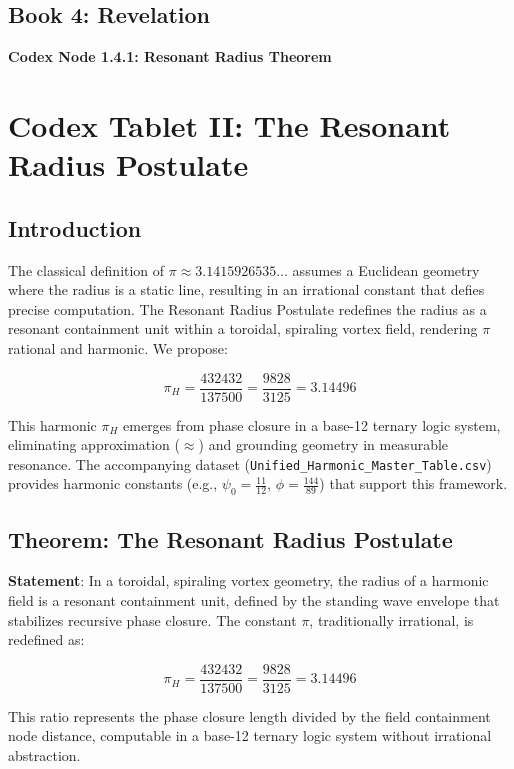 \documentclass[a4paper,12pt]{book}
\newcommand{\codexnode}[5]{%
  \par\vspace{0.5em}%
  \noindent\textbf{Codex Node #1.#2.#3: #5}\label{#4}%
  \par\vspace{0.5em}%
}
\begin{document}
\subsection{Book 4: Revelation}
\codexnode{1}{4}{1}{section1/book4/codex_resonant_radius_theorem}{Resonant Radius Theorem}
\section{Codex Tablet II: The Resonant Radius Postulate}
\label{sec:resonant_radius}

\subsection{Introduction}
The classical definition of \(\pi \approx 3.1415926535\ldots\) assumes a Euclidean geometry where the radius is a static line, resulting in an irrational constant that defies precise computation. The Resonant Radius Postulate redefines the radius as a resonant containment unit within a toroidal, spiraling vortex field, rendering \(\pi\) rational and harmonic. We propose:

\[
\pi_H = \frac{432432}{137500} = \frac{9828}{3125} = 3.14496
\]

This harmonic \(\pi_H\) emerges from phase closure in a base-12 ternary logic system, eliminating approximation (\(\approx\)) and grounding geometry in measurable resonance. The accompanying dataset (\texttt{Unified\_Harmonic\_Master\_Table.csv}) provides harmonic constants (e.g., \(\psi_0 = \frac{11}{12}\), \(\phi = \frac{144}{89}\)) that support this framework.

\subsection{Theorem: The Resonant Radius Postulate}
\textbf{Statement}: In a toroidal, spiraling vortex geometry, the radius of a harmonic field is a resonant containment unit, defined by the standing wave envelope that stabilizes recursive phase closure. The constant \(\pi\), traditionally irrational, is redefined as:

\[
\pi_H = \frac{432432}{137500} = \frac{9828}{3125} = 3.14496
\]

This ratio represents the phase closure length divided by the field containment node distance, computable in a base-12 ternary logic system without irrational abstraction.
\end{document}
